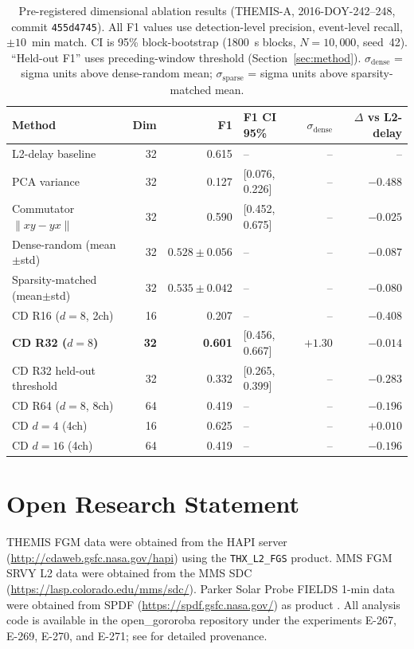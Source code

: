 \documentclass[draft]{agujournal2025}
\let\citep\cite%
\begin{document}
\begin{table}[htbp]
\caption{Pre-registered dimensional ablation results (THEMIS-A, 2016-DOY-242--248,
commit \texttt{455d4745}).
All F1 values use detection-level precision, event-level recall, $\pm 10$~min match.
CI is 95\% block-bootstrap (1800~s blocks, $N=10{,}000$, seed~42).
``Held-out F1'' uses preceding-window threshold (Section~\ref{sec:method}).
$\sigma_\mathrm{dense}$ = sigma units above dense-random mean; $\sigma_\mathrm{sparse}$ = sigma units above sparsity-matched mean.}
\label{tab:ablation}
\begin{tabular}{lrrlrr}
\toprule
Method & Dim & F1 & F1 CI 95\% & $\sigma_\mathrm{dense}$ & $\Delta$ vs L2-delay \\
\midrule
L2-delay baseline           & 32 & 0.615 & -- & -- & -- \\
PCA variance                & 32 & 0.127 & [0.076, 0.226] & -- & $-0.488$ \\
Commutator $\|xy-yx\|$      & 32 & 0.590 & [0.452, 0.675] & -- & $-0.025$ \\
Dense-random (mean$\pm$std) & 32 & $0.528\pm0.056$ & -- & -- & $-0.087$ \\
Sparsity-matched (mean$\pm$std) & 32 & $0.535\pm0.042$ & -- & -- & $-0.080$ \\
CD R16 ($d=8$, 2ch)         & 16 & 0.207 & -- & -- & $-0.408$ \\
\textbf{CD R32 ($d=8$)}     & \textbf{32} & \textbf{0.601} & [0.456, 0.667] & $+1.30$ & $-0.014$ \\
CD R32 held-out threshold   & 32 & 0.332 & [0.265, 0.399] & -- & $-0.283$ \\
CD R64 ($d=8$, 8ch)         & 64 & 0.419 & -- & -- & $-0.196$ \\
CD $d=4$ (4ch)              & 16 & 0.625 & -- & -- & $+0.010$ \\
CD $d=16$ (4ch)             & 64 & 0.419 & -- & -- & $-0.196$ \\
\bottomrule
\end{tabular}
\end{table}

\section*{Open Research Statement}

THEMIS FGM data were obtained from the HAPI server \citep{weigel2021}
(\url{http://cdaweb.gsfc.nasa.gov/hapi}) using the
\texttt{THX\_L2\_FGS} product.
MMS FGM SRVY L2 data were obtained from the MMS SDC
(\url{https://lasp.colorado.edu/mms/sdc/}).
Parker Solar Probe FIELDS 1-min data were obtained from SPDF
(\url{https://spdf.gsfc.nasa.gov/}) as product
.
All analysis code is available in the open\_gororoba repository
under the experiments E-267, E-269, E-270, and E-271;
see  for detailed provenance.
\end{document}
